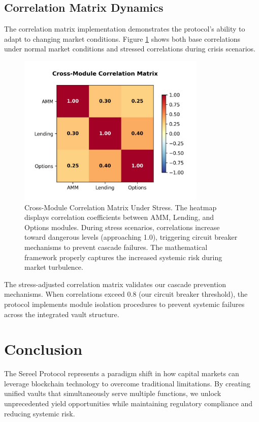 \documentclass[12pt]{article}
\begin{document}
\subsection{Correlation Matrix Dynamics}

The correlation matrix implementation demonstrates the protocol's ability to adapt to changing market conditions. Figure \ref{fig:correlation_matrix} shows both base correlations under normal market conditions and stressed correlations during crisis scenarios.

\begin{figure}[h]
    \centering
    \includegraphics[width=0.8\textwidth]{correlation_matrix.jpg}
    \caption{Cross-Module Correlation Matrix Under Stress. The heatmap displays correlation coefficients between AMM, Lending, and Options modules. During stress scenarios, correlations increase toward dangerous levels (approaching 1.0), triggering circuit breaker mechanisms to prevent cascade failures. The mathematical framework properly captures the increased systemic risk during market turbulence.}
    \label{fig:correlation_matrix}
\end{figure}

The stress-adjusted correlation matrix validates our cascade prevention mechanisms. When correlations exceed 0.8 (our circuit breaker threshold), the protocol implements module isolation procedures to prevent systemic failures across the integrated vault structure.


\section{Conclusion}

The Sereel Protocol represents a paradigm shift in how capital markets can leverage blockchain technology to overcome traditional limitations. By creating unified vaults that simultaneously serve multiple functions, we unlock unprecedented yield opportunities while maintaining regulatory compliance and reducing systemic risk.
\end{document}
